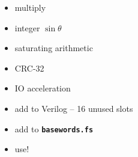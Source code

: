 \documentclass[compress,mathserif]{beamer}
\newcommand{\mach}[1]{\texttt{\textbf{#1}}}
\begin{document}
\begin{frame}
\begin{itemize}
   \item multiply
   \item integer $\sin\theta$
   \item saturating arithmetic
   \item CRC-32
   \item IO acceleration
\end{itemize}
\end{frame}

\begin{frame}
\begin{itemize}
   \item add to Verilog -- 16 unused slots
   \item add to \mach{basewords.fs}
   \item use!
\end{itemize}
\end{frame}

\emptyslide
\end{document}
